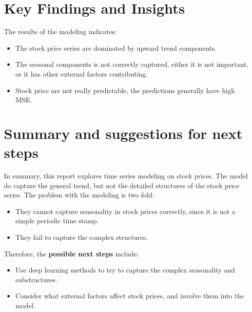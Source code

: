 \documentclass[11pt]{article}
\begin{document}
\section{Key Findings and Insights}\label{section-find}
The results of the modeling indicates:
\begin{itemize}
\item The stock price series are dominated by upward trend components.
\item The seasonal components is not correctly captured, either it is not important, or it has other external factors contributing.
\item Stock price are not really predictable, the predictions generally have high MSE.
\end{itemize}

\section{Summary and suggestions for next steps}\label{section-sugg}
In summary, this report explores time series modeling on stock prices. The model do capture the general trend, but not the detailed structures of the stock price series.
The problem with the modeling is two fold:
\begin{itemize}
\item They cannot capture seasonality in stock prices correctly, since it is not a simple periodic time stamp.
\item They fail to capture the complex structures.
\end{itemize}
Therefore, the \textbf{possible next steps} include:
\begin{itemize}
\item Use deep learning methods to try to capture the complex seasonality and substructures.
\item Consider what external factors affect stock prices, and involve them into the model.
\end{itemize}

%
\end{document}
